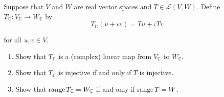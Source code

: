 \begin{exercise}
    Suppose that $V$ and $W$ are real vector spaces and $T \in \mathcal{L}(V, W)$. Define $T_{\mathbb{C}}: V_{\mathbb{C}} \to W_{\mathbb{C}}$ by
    \[
        T_{\mathbb{C}}(u + \iota v) = Tu + \iota Tv
    \]

    for all $u, v\in V$.
    \begin{enumerate}[label={(\alph*)}]
        \item Show that $T_{\mathbb{C}}$ is a (complex) linear map from $V_{\mathbb{C}}$ to $W_{\mathbb{C}}$.
        \item Show that $T_{\mathbb{C}}$ is injective if and only if $T$ is injective.
        \item Show that $\text{range}\,{T}_{\mathbb{C}} = W_{\mathbb{C}}$ if and only if $\text{range}\,{T} = W$.
    \end{enumerate}
\end{exercise}

